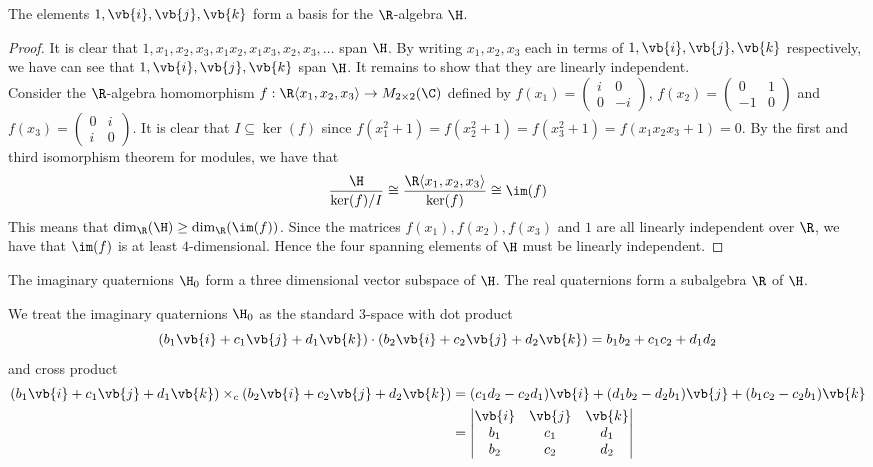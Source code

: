 \documentclass[a4paper]{article}
\begin{document}
\begin{prp}{}{} The elements $1,\vb{i},\vb{j},\vb{k}$ form a basis for the $\R$-algebra $\H$. 
\begin{proof}
It is clear that $1,x_1,x_2,x_3,x_1x_2,x_1x_3,x_2,x_3,\dots$ span $\H$. By writing $x_1,x_2,x_3$ each in terms of $1,\vb{i},\vb{j},\vb{k}$ respectively, we have can see that $1,\vb{i},\vb{j},\vb{k}$ span $\H$. It remains to show that they are linearly independent. \\

Consider the $\R$-algebra homomorphism $f:\R\langle x_1,x_2,x_3\rangle\to M_{2\times 2}(\C)$ defined by $f(x_1)=\begin{pmatrix}
i & 0\\
0 & -i
\end{pmatrix}$, $f(x_2)=\begin{pmatrix}
0 & 1\\
-1 & 0
\end{pmatrix}$ and $f(x_3)=\begin{pmatrix}
0 & i\\
i & 0
\end{pmatrix}$. It is clear that $I\subseteq\ker(f)$ since $f(x_1^2+1)=f(x_2^2+1)=f(x_3^2+1)=f(x_1x_2x_3+1)=0$. By the first and third isomorphism theorem for modules, we have that $$\frac{\H}{\ker(f)/I}\cong\frac{\R\langle x_1,x_2,x_3\rangle}{\ker(f)}\cong\im(f)$$
This means that $\dim_\R(\H)\geq\dim_\R(\im(f))$. Since the matrices $f(x_1),f(x_2),f(x_3)$ and $1$ are all linearly independent over $\R$, we have that $\im(f)$ is at least $4$-dimensional. Hence the four spanning elements of $\H$ must be linearly independent. 
\end{proof}
\end{prp}

\begin{prp}{}{} The imaginary quaternions $\H_0$ form a three dimensional vector subspace of $\H$. The real quaternions form a subalgebra $\R$ of $\H$. 
\end{prp}

We treat the imaginary quaternions $\H_0$ as the standard $3$-space with dot product $$(b_1\vb{i}+c_1\vb{j}+d_1\vb{k})\cdot(b_2\vb{i}+c_2\vb{j}+d_2\vb{k})=b_1b_2+c_1c_2+d_1d_2$$ and cross product 
\begin{align*}
(b_1\vb{i}+c_1\vb{j}+d_1\vb{k})\times_c(b_2\vb{i}+c_2\vb{j}+d_2\vb{k})&=(c_1d_2-c_2d_1)\vb{i}+(d_1b_2-d_2b_1)\vb{j}+(b_1c_2-c_2b_1)\vb{k}\\
&=\begin{vmatrix}
\vb{i} & \vb{j} & \vb{k}\\
b_1 & c_1 & d_1\\
b_2 & c_2 & d_2
\end{vmatrix}
\end{align*}
\end{document}
